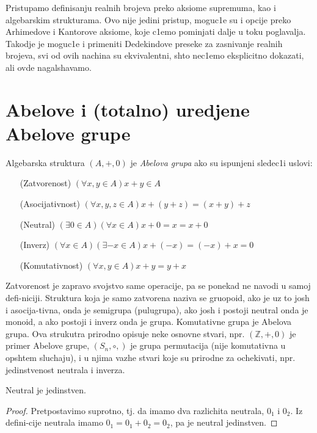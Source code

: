 \documentclass[../main_og.tex]{subfiles}
\begin{document}
    Pristupamo definisanju realnih brojeva preko aksiome supremuma, kao i algebarskim strukturama. Ovo nije jedini pristup, moguc1e su i opcije preko Arhimedove i Kantorove aksiome, koje c1emo pominjati dalje u toku poglavalja. Takodje je moguc1e i primeniti Dedekindove preseke za zasnivanje realnih brojeva, svi od ovih nachina su ekvivalentni, shto nec1emo eksplicitno dokazati, ali ovde nagalshavamo.

\section{Abelove i (totalno) uredjene Abelove grupe}

    {\de Algebarska struktura $(A,+,0)$ je \textit{Abelova grupa} ako su ispunjeni sledec1i uslovi:

\begin{itemize}[itemindent=6em]
    \item[(Zatvorenost)] $(\forall x,y\in A) x+y\in A$  
    \item[(Asocijativnost)] $(\forall x,y,z \in A) x+(y+z)=(x+y)+z$ 
    \item[(Neutral)] $(\exists 0 \in A) (\forall x \in A) x+0=x=x+0$ 
    \item[(Inverz)] $(\forall x\in A) (\exists -x\in A) x+(-x)=(-x)+x=0$  
    \item[(Komutativnost)]  $(\forall x,y\in A)x+y=y+x$  
\end{itemize}}

    Zatvorenost je zapravo svojstvo same operacije, pa se ponekad ne navodi u samoj defi-niciji. Struktura koja je samo zatvorena naziva se gruopoid, ako je uz to josh i asocija-tivna, onda je semigrupa (pulugrupa), ako josh i postoji neutral onda je monoid, a ako postoji i inverz onda je grupa. Komutativne grupa je Abelova grupa. Ova strukutra prirodno opisuje neke osnovne stvari, npr. $(\mathbb{Z},+,0)$ je primer Abelove grupe, $(S_n,\circ,)$ je grupa permutacija (nije komutativna u opshtem sluchaju), i u njima vazhe stvari koje su prirodne za ochekivati, npr. jedinstvenost neutrala i inverza.    

    {\tvr Neutral je jedinstven.}

    \begin{proof} 
        Pretpostavimo suprotno, tj. da imamo dva razlichita neutrala, $0_1$ i $0_2$. Iz defini-cije neutrala imamo $0_1=0_1+0_2=0_2$, pa je neutral jedinstven.\end{proof}
\end{document}
